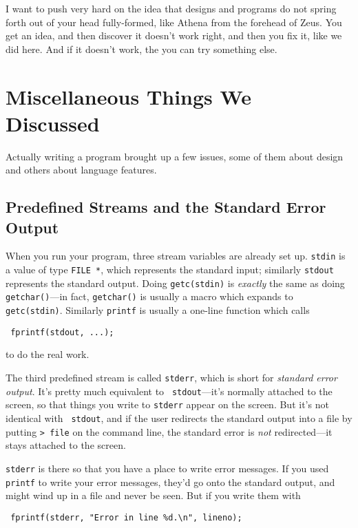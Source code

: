 I want to push very hard on the idea that designs and programs do not
spring forth out of your head fully-formed, like Athena from the
forehead of Zeus.  You get an idea, and then discover it doesn't work
right, and then you fix it, like we did here.  And if it doesn't work,
the you can try something else. 

\section{Miscellaneous Things We Discussed}

Actually writing a program brought up a few issues, some of them about
design and others about language features.

\subsection{Predefined Streams and the Standard Error Output}

When you run your program, three stream variables are already set up.
{\tt stdin} is a value of type {\tt FILE *}, which represents the
standard input; similarly {\tt stdout} represents the standard output.
Doing {\tt getc(stdin)} is {\em exactly}\/ the same as doing {\tt
getchar()}---in fact, {\tt getchar()} is usually a macro which expands
to {\tt getc(stdin)}.  Similarly {\tt printf} is usually a one-line
function which calls 

\begin{flushleft}
\verb! fprintf(stdout, ...); !
\end{flushleft}

\noindent to do the real work.

The third predefined stream is called {\tt stderr}, which is short for
{\em standard error output}\/.  It's pretty much equivalent to {\tt
stdout}---it's normally attached to the screen, so that things you write
to {\tt stderr} appear on the screen.  But it's not identical with {\tt
stdout}, and if the user redirects the standard output into a file by
putting {\tt > file} on the command line, the standard error is {\em
not}\/ redirected---it stays attached to the screen.

{\tt stderr} is there so that you have a place to write error messages.
If you used {\tt printf} to write your error messages, they'd go onto
the standard output, and might wind up in a file and never be seen.  But
if you write them with 

\begin{flushleft}
\verb! fprintf(stderr, "Error in line %d.\n", lineno); !
\end{flushleft}

